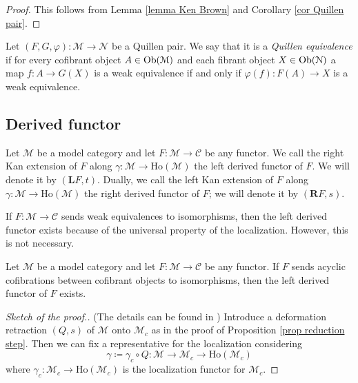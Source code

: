 \begin{refsection}
\begin{proof}
This follows from Lemma \ref{lemma Ken Brown} and Corollary \ref{cor Quillen pair}.
\end{proof}

\begin{defin}
Let $(F,G,\varphi) \colon \mathcal M \to \mathcal N$ be a Quillen pair. We say that it is a \emph{Quillen equivalence} if for every cofibrant object $A \in \operatorname{Ob}(\mathcal M)$ and each fibrant object $X \in \operatorname{Ob}(\mathcal N)$ a map $f \colon A \to G(X)$ is a weak equivalence if and only if $\varphi(f) \colon F(A) \to X$ is a weak equivalence.
\end{defin}

\subsection{Derived functor}

\begin{defin}
Let $\mathcal M$ be a model category and let $F \colon \mathcal M \to \mathcal C$ be any functor. We call the right Kan extension of $F$ along $\gamma \colon \mathcal M \to \text{Ho}(\mathcal M)$ the left derived functor of $F$. We will denote it by $(\mathbf LF,t)$. Dually, we call the left Kan extension of $F$ along $\gamma \colon \mathcal M \to \text{Ho}(\mathcal M)$ the right derived functor of $F$; we will denote it by $(\mathbf RF,s)$.
\end{defin}

\begin{rmk}
If $F \colon \mathcal M \to \mathcal C$ sends weak equivalences to isomorphisms, then the left derived functor exists because of the universal property of the localization. However, this is not necessary. %
\end{rmk}

\begin{thm} \label{thm existence derived functor}
Let $\mathcal M$ be a model category and let $F \colon \mathcal M \to \mathcal C$ be any functor. If $F$ sends acyclic cofibrations between cofibrant objects to isomorphisms, then the left derived functor of $F$ exists.
\end{thm}

\begin{proof}[Sketch of the proof.] (The details can be found in \cite[Theorem 2.2.8]{riehl}) Introduce a deformation retraction $(Q,s)$ of $\mathcal M$ onto $\mathcal M_c$ as in the proof of Proposition \ref{prop reduction step}. Then we can fix a representative for the localization considering
\[
\gamma\coloneqq \gamma_c \circ Q \colon \mathcal M \to \mathcal M_c \to \mathrm{Ho}(\mathcal M_c)
\]
where $\gamma_c \colon \mathcal M_c \to \mathrm{Ho}(\mathcal M_c)$ is the localization functor for $\mathcal M_c$.


\end{proof}
\end{refsection}
